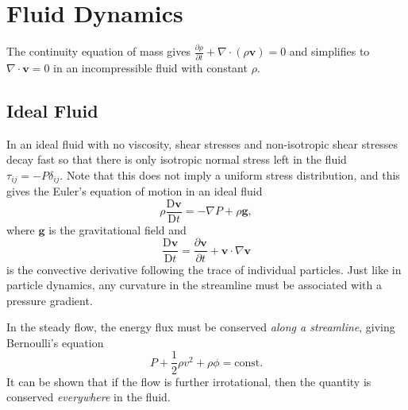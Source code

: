 \documentclass{article}
\begin{document}
\section{Fluid Dynamics}
The continuity equation of mass gives \( \frac{\partial \rho }{\partial t} + \nabla \cdot (\rho  \mathbf{v})  = 0\) and simplifies to \(\boxed{\nabla \cdot \mathbf{v} = 0}\) in an incompressible fluid with constant $\rho. $ 

\subsection{Ideal Fluid}
In an ideal fluid with no viscosity, shear stresses and non-isotropic shear stresses decay fast so that there is only isotropic normal stress left in the fluid $\tau_{ij} = -P \delta_{ij}. $ Note that this does not imply a uniform stress distribution, and this gives the Euler's equation of motion in an ideal fluid
\[
    \boxed{
        \rho \frac{\mathrm{D}\mathbf{v} }{\mathrm{D}t} = -\nabla P + \rho \mathbf{g},
    }
\]
where $\mathbf{g}$ is the gravitational field and 
\[
    \boxed{
        \frac{\mathrm{D}\mathbf{v} }{\mathrm{D}t}  = \frac{\partial \mathbf{v} }{\partial t} + \mathbf{v} \cdot \nabla \mathbf{v} 
    }
\]
is the convective derivative following the trace of individual particles. 
Just like in particle dynamics, any curvature in the streamline must be associated with a pressure gradient. 

In the steady flow, the energy flux must be conserved \textit{along a streamline}, giving Bernoulli's equation 
\[
    P + \frac{1}{2}\rho v^{2} + \rho \phi = \mathrm{const}.  
\]
It can be shown that if the flow is further irrotational, then the quantity is conserved \textit{everywhere} in the fluid.
\end{document}
